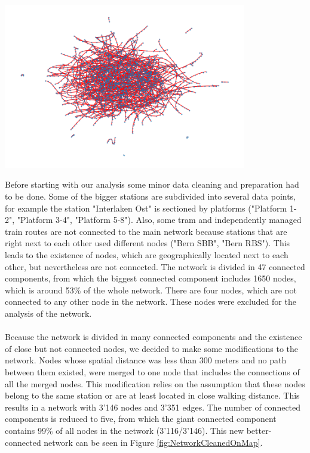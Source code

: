 \documentclass{Resources/netsci-project}
\begin{document}
\begin{center}
    \centering
    \includegraphics[width=300pt]{Resources/Network_no_map}
    \label{fig:NetworkNoMap}
\end{center}
\noindent
Before starting with our analysis some minor data cleaning and preparation had to be done. Some of the bigger stations are subdivided into several data points, for example the station "Interlaken Ost" is sectioned by platforms ("Platform 1-2", "Platform 3-4", "Platform 5-8"). Also, some tram and independently managed train routes are not connected to the main network because stations that are right next to each other used different nodes ("Bern SBB", "Bern RBS"). This leads to the existence of nodes, which are geographically located next to each other, but nevertheless are not connected. The network is divided in 47 connected components, from which the biggest connected component includes 1650 nodes, which is around 53\% of the whole network. There are four nodes, which are not connected to any other node in the network. These nodes were excluded for the analysis of the network.
\\~\\
Because the network is divided in many connected components and the existence of close but not connected nodes, we decided to make some modifications to the network. Nodes whose spatial distance was less than 300 meters and no path between them existed, were merged to one node that includes the connections of all the merged nodes. This modification relies on the assumption that these nodes belong to the same station or are at least located in close walking distance. This results in a network with 3'146 nodes and 3'351 edges. The number of connected components is reduced to five, from which the giant connected component contains 99\% of all nodes in the network (3’116/3’146). This new better-connected network can be seen in Figure \ref{fig:NetworkCleanedOnMap}.
\end{document}

